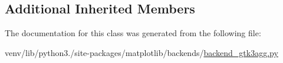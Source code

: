 \subsection*{Additional Inherited Members}


The documentation for this class was generated from the following file\+:\begin{DoxyCompactItemize}
\item 
venv/lib/python3./site-\/packages/matplotlib/backends/\hyperlink{backend__gtk3agg_8py}{backend\+\_\+gtk3agg.\+py}\end{DoxyCompactItemize}
